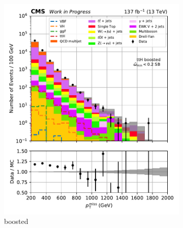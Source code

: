 \begin{figure}[htbp]
    \centering
    \begin{subfigure}[b]{0.24\textwidth}
        \includegraphics[width=\textwidth]{figures/region_plots/2016to18/sideband_3/ttH_boosted.pdf}
        \caption{\ttH boosted}
    \end{subfigure}
    \hfill
    \begin{subfigure}[b]{0.24\textwidth}

\end{subfigure}
\end{figure}
